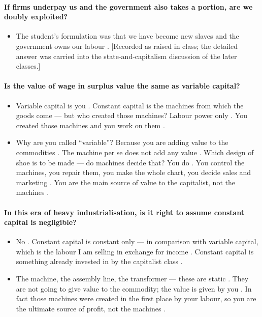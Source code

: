 \paragraph{If firms underpay us and the government also takes a portion, are we doubly exploited?}
\begin{itemize}
    \item The student's formulation was that we have become new slaves and the government owns our labour . [Recorded as raised in class; the detailed answer was carried into the state-and-capitalism discussion of the later classes.] 
\end{itemize}

\paragraph{Is the value of wage in surplus value the same as variable capital?}
\begin{itemize}
    \item Variable capital is you . Constant capital is the machines from which the goods come --- but who created those machines? Labour power only . You created those machines and you work on them .
    \item Why are you called ``variable''? Because you are adding value to the commodities . The machine per se does not add any value . Which design of shoe is to be made --- do machines decide that? You do . You control the machines, you repair them, you make the whole chart, you decide sales and marketing . You are the main source of value to the capitalist, not the machines .
\end{itemize}

\paragraph{In this era of heavy industrialisation, is it right to assume constant capital is negligible?}
\begin{itemize}
    \item No . Constant capital is constant only --- in comparison with variable capital, which is the labour I am selling in exchange for income . Constant capital is something already invested in by the capitalist class .
    \item The machine, the assembly line, the transformer --- these are static . They are not going to give value to the commodity; the value is given by you . In fact those machines were created in the first place by your labour, so you are the ultimate source of profit, not the machines .
\end{itemize}

